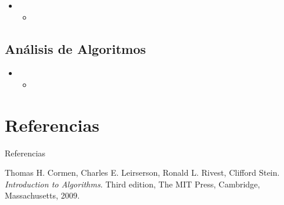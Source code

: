 \documentclass[aspectratio=169]{beamer}
\begin{document}
\begin{frame}{}
  \begin{itemize}
    \item 
    \begin{itemize}
      \item 
    \end{itemize}
  \end{itemize}
\end{frame}

\subsection{Análisis de Algoritmos}

\begin{frame}{}
  \begin{itemize}
    \item 
    \begin{itemize}
      \item 
    \end{itemize}
  \end{itemize}
\end{frame}

\section{Referencias}
\begin{frame}{Referencias}
  \begin{thebibliography}{9}
    Thomas H. Cormen, Charles E. Leirserson, Ronald L. Rivest, Clifford Stein.
    \textit{Introduction to Algorithms}. Third edition, The MIT Press, Cambridge, Massachusetts, 2009.
  \end{thebibliography}
\end{frame}
\end{document}
